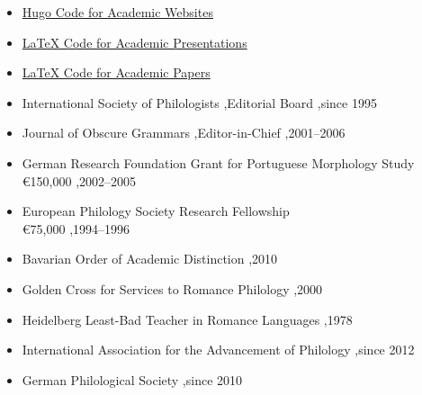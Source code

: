 \documentclass[letterpaper,10pt]{article}
\begin{document}

\begin{itemize}
\item \href{https://github.com/pmichaillat/hugo-website}{Hugo Code for Academic Websites}
\item \href{https://github.com/pmichaillat/latex-presentation}{LaTeX Code for Academic Presentations}
\item \href{https://github.com/pmichaillat/latex-paper}{LaTeX Code for Academic Papers}
\end{itemize}


\begin{itemize}
\item International Society of Philologists \sep Editorial Board \sep since 1995
\item Journal of Obscure Grammars \sep Editor-in-Chief \sep 2001--2006
\end{itemize}


\begin{itemize}
\item German Research Foundation Grant for Portuguese Morphology Study\\
€150,000 \sep 2002--2005
\item European Philology Society Research Fellowship  \\
€75,000 \sep 1994--1996
\end{itemize}


\begin{itemize}
\item Bavarian Order of Academic Distinction \sep 2010
\item Golden Cross for Services to Romance Philology \sep 2000
\item Heidelberg Least-Bad Teacher in Romance Languages \sep 1978
\end{itemize}


\begin{itemize}
\item International Association for the Advancement of Philology \sep since 2012
\item German Philological Society \sep since 2010
\end{itemize}
\end{document}
